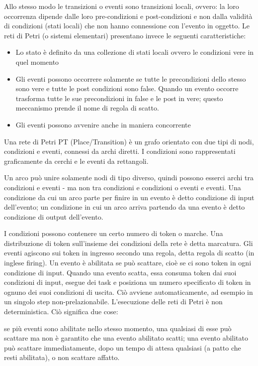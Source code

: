 Allo stesso modo le transizioni o eventi sono transizioni locali, ovvero: la loro occorrenza dipende dalle loro pre-condizioni e post-condizioni e non dalla validità di condizioni (stati locali) che non hanno connessione con l’evento in oggetto.
Le reti di Petri (o sistemi elementari) presentano invece le seguenti caratteristiche:
\begin{itemize}
 \item Lo stato è definito da una collezione di stati locali ovvero le condizioni vere in quel momento 
 \item Gli eventi possono occorrere solamente se tutte le precondizioni dello stesso sono vere e tutte
le post condizioni sono false. Quando un evento occorre trasforma tutte le sue precondizioni
in false e le post in vere; questo meccanismo prende il nome di regola di scatto.
\item Gli eventi possono avvenire anche in maniera concorrente
\end{itemize}

  Una rete di Petri PT (Place/Transition) è un grafo orientato con due tipi di nodi, condizioni e eventi, connessi da archi diretti. I condizioni sono rappresentati graficamente da cerchi e le eventi da rettangoli.

Un arco può unire solamente nodi di tipo diverso, quindi possono esserci archi tra condizioni e eventi - ma non tra condizioni e condizioni o eventi e eventi. Una condizione da cui un arco parte per finire in un evento è detto condizione di input dell'evento; un condizione in cui un arco arriva partendo da una evento è detto condizione di output dell'evento.

I condizioni possono contenere un certo numero di token o marche. Una distribuzione di token sull'insieme dei condizioni della rete è detta marcatura. Gli eventi agiscono sui token in ingresso secondo una regola, detta regola di scatto (in inglese firing). Un evento è abilitata se può scattare, cioè se ci sono token in ogni condizione di input. Quando una evento scatta, essa consuma token dai suoi condizioni di input, esegue dei task e posiziona un numero specificato di token in ognuno dei suoi condizioni di uscita. Ciò avviene automaticamente, ad esempio in un singolo step non-prelazionabile. L'esecuzione delle reti di Petri è non deterministica. Ciò significa due cose:

    se più eventi sono abilitate nello stesso momento, una qualsiasi di esse può scattare ma
    non è garantito che una evento abilitato scatti; una evento abilitato può scattare immediatamente, dopo un tempo di attesa qualsiasi (a patto che resti abilitata), o non scattare affatto.

